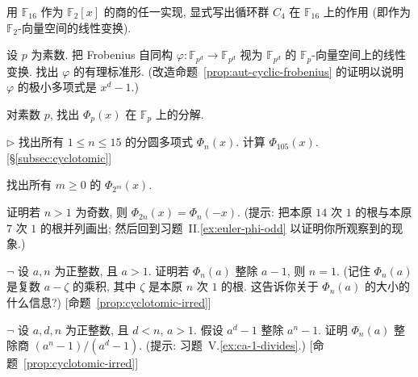 \begin{prob}\label{ex:F16-frobenius-action}
用 $\mathbb{F}_{16}$ 作为 $\mathbb{F}_2[x]$ 的商的任一实现, 显式写出循环群 $C_4$ 在 $\mathbb{F}_{16}$ 上的作用 (即作为 $\mathbb{F}_2$-向量空间的线性变换).
\end{prob}

\begin{prob}\label{ex:frobenius-rational-canonical}
设 $p$ 为素数. 把 Frobenius 自同构 $\varphi:\mathbb{F}_{p^d}\to\mathbb{F}_{p^d}$ 视为 $\mathbb{F}_{p^d}$ 的 $\mathbb{F}_p$-向量空间上的线性变换. 找出 $\varphi$ 的有理标准形. (改造命题~\ref{prop:aut-cyclic-frobenius} 的证明以说明 $\varphi$ 的极小多项式是 $x^d-1$.)
\end{prob}

\begin{prob}\label{ex:factor-Phi-p-Fp}
对素数 $p$, 找出 $\Phi_p(x)$ 在 $\mathbb{F}_p$ 上的分解.
\end{prob}

\begin{prob}\label{ex:cyclotomic-1-15}
$\triangleright$ 找出所有 $1\leq n\leq 15$ 的分圆多项式 $\Phi_n(x)$. 计算 $\Phi_{105}(x)$. [§\ref{subsec:cyclotomic}]
\end{prob}

\begin{prob}\label{ex:cyclotomic-2m}
找出所有 $m\geq 0$ 的 $\Phi_{2^m}(x)$.
\end{prob}

\begin{prob}\label{ex:Phi-2n-Phi-n}
证明若 $n>1$ 为奇数, 则 $\Phi_{2n}(x)=\Phi_n(-x)$. (提示: 把本原 $14$ 次 $1$ 的根与本原 $7$ 次 $1$ 的根并列画出; 然后回到习题~II.\ref{ex:euler-phi-odd} 以证明你所观察到的现象.)
\end{prob}

\begin{prob}\label{ex:Phi-n-divides}
$\neg$ 设 $a,n$ 为正整数, 且 $a>1$. 证明若 $\Phi_n(a)$ 整除 $a-1$, 则 $n=1$. (记住 $\Phi_n(a)$ 是复数 $a-\zeta$ 的乘积, 其中 $\zeta$ 是本原 $n$ 次 $1$ 的根. 这告诉你关于 $\Phi_n(a)$ 的大小的什么信息?) [命题~\ref{prop:cyclotomic-irred}]
\end{prob}

\begin{prob}\label{ex:Phi-n-quotient}
$\neg$ 设 $a,d,n$ 为正整数, 且 $d<n$, $a>1$. 假设 $a^d-1$ 整除 $a^n-1$. 证明 $\Phi_n(a)$ 整除商 $(a^n-1)/(a^d-1)$. (提示: 习题~V.\ref{ex:ca-1-divides}.) [命题~\ref{prop:cyclotomic-irred}]
\end{prob}

